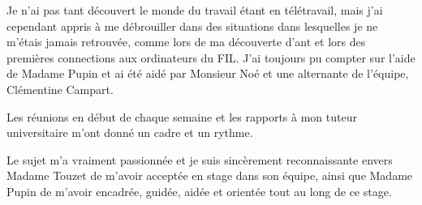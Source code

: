 \documentclass[11pt, a4paper]{report}
\begin{document}
	Je n'ai pas tant découvert le monde du travail étant en télétravail, mais j'ai cependant appris à me débrouiller dans des situations dans lesquelles je ne m'étais jamais retrouvée, comme lors de ma découverte d'ant et lors des premières connections aux ordinateurs du FIL. J'ai toujours pu compter sur l'aide de Madame Pupin et ai été aidé par Monsieur Noé et une alternante de l'équipe, Clémentine Campart.
	
	Les réunions en début de chaque semaine et les rapports à mon tuteur universitaire m'ont donné un cadre et un rythme.
	
	Le sujet m'a vraiment passionnée et je suis sincèrement reconnaissante envers Madame Touzet de m'avoir acceptée en stage dans son équipe, ainsi que Madame Pupin de m'avoir encadrée, guidée, aidée et orientée tout au long de ce stage.
	
	
	
\end{document}
